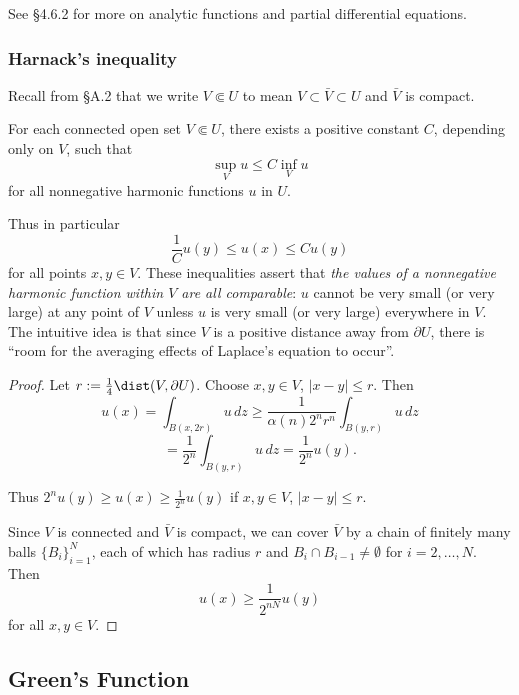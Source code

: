 See \S4.6.2 for more on analytic functions and partial differential equations.

\subsubsection{Harnack's inequality}
\label{sec:laplace-harnacks-inequality}

Recall from \S A.2 that we write $V \Subset U$ to mean $V \subset \bar{V} \subset U$ and $\bar{V}$ is compact.

\begin{theorem}
\label{thm:harnacks-inequality}
For each connected open set $V \Subset U$, there exists a positive constant $C$, depending only on $V$, such that
$$\sup_V u \le C \inf_V u$$
for all nonnegative harmonic functions $u$ in $U$.
\end{theorem}

Thus in particular
$$\frac{1}{C}u(y) \le u(x) \le Cu(y)$$
for all points $x, y \in V$. These inequalities assert that \textit{the values of a nonnegative harmonic function within $V$ are all comparable}: $u$ cannot be very small (or very large) at any point of $V$ unless $u$ is very small (or very large) everywhere in $V$. The intuitive idea is that since $V$ is a positive distance away from $\partial U$, there is ``room for the averaging effects of Laplace's equation to occur''.

\begin{proof}
Let $r := \frac{1}{4} \dist(V, \partial U)$. Choose $x, y \in V$, $|x - y| \leq r$. Then
$$u(x) = \int_{B(x,2r)} u \, dz \geq \frac{1}{\alpha(n)2^n r^n} \int_{B(y,r)} u \, dz$$
$$= \frac{1}{2^n} \int_{B(y,r)} u \, dz = \frac{1}{2^n} u(y).$$

Thus $2^n u(y) \geq u(x) \geq \frac{1}{2^n} u(y)$ if $x, y \in V$, $|x - y| \leq r$.

Since $V$ is connected and $\bar{V}$ is compact, we can cover $\bar{V}$ by a chain of finitely many balls $\{B_i\}_{i=1}^N$, each of which has radius $r$ and $B_i \cap B_{i-1} \neq \emptyset$ for $i = 2, \ldots, N$. Then
$$u(x) \geq \frac{1}{2^{nN}} u(y)$$
for all $x, y \in V$.
\end{proof}

\subsection{Green's Function}
\label{sec:laplace-greens-function}

